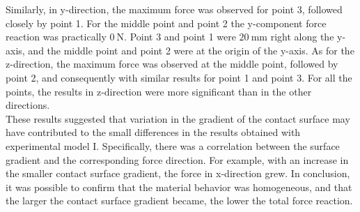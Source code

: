Similarly, in y-direction, the maximum force was observed for point \SI{3}{}, followed closely by point \SI{1}{}. For 
the middle point and point \SI{2}{} the y-component force reaction was practically $\SI{0}{\newton}$.  Point \SI{3}{} and point \SI{1}{} were 
$\SI{20}{\milli \m}$ right along the y-axis, and the middle point and point \SI{2}{} were at the origin of the y-axis.
As for the z-direction, the maximum force was observed at the middle point, followed by point \SI{2}{}, and consequently with 
similar results for point \SI{1}{} and point \SI{3}{}. For all the points, the results in z-direction were more significant than 
in the other directions.\\

These results suggested that variation in the gradient of the contact surface may have contributed
to the small differences in the results obtained with experimental model I. Specifically, there was a correlation between the 
surface gradient and the corresponding force direction. For example, with an increase in the smaller contact surface gradient, 
the force in x-direction grew.
In conclusion, it was possible to confirm that the material behavior was 
homogeneous, and that the larger the contact surface gradient became, the lower the total force reaction.

